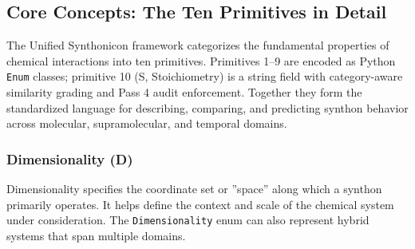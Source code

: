 \documentclass[12pt,a4paper]{article}
\begin{document}
\subsection{Core Concepts: The Ten Primitives in Detail}

The Unified Synthonicon framework categorizes the fundamental properties of chemical interactions into ten primitives. Primitives 1--9 are encoded as Python \texttt{Enum} classes; primitive 10 (S, Stoichiometry) is a string field with category-aware similarity grading and Pass 4 audit enforcement. Together they form the standardized language for describing, comparing, and predicting synthon behavior across molecular, supramolecular, and temporal domains.

\subsubsection{Dimensionality (D)}

Dimensionality specifies the coordinate set or ''space'' along which a synthon primarily operates. It helps define the context and scale of the chemical system under consideration. The \texttt{Dimensionality} enum can also represent hybrid systems that span multiple domains.
\end{document}
